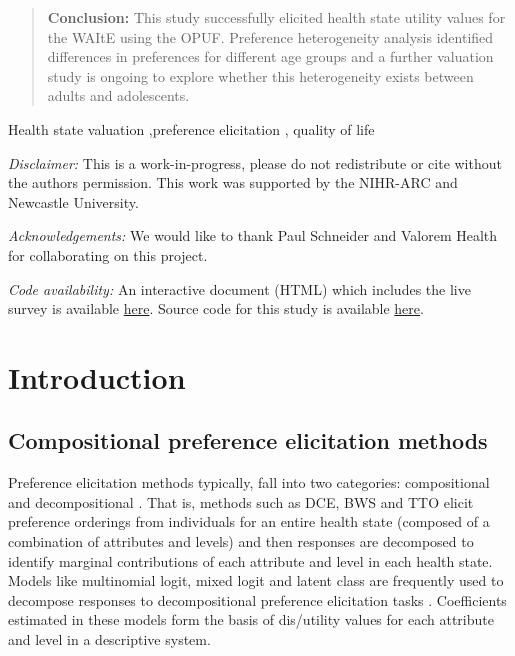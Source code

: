 \documentclass[
  number,
  preprint]{elsarticle}
\begin{document}
\begin{frontmatter}
\begin{abstract}
\textbf{Conclusion:} This study successfully elicited health state
utility values for the WAItE using the OPUF. Preference heterogeneity
analysis identified differences in preferences for different age groups
and a further valuation study is ongoing to explore whether this
heterogeneity exists between adults and adolescents.
\end{abstract}





\begin{keyword}
    Health state valuation \sep preference elicitation \sep 
    quality of life
\end{keyword}
\end{frontmatter}
    

\emph{Disclaimer:} This is a work-in-progress, please do not
redistribute or cite without the authors permission. This work was
supported by the NIHR-ARC and Newcastle University.

\emph{Acknowledgements:} We would like to thank Paul Schneider and
Valorem Health for collaborating on this project.

\emph{Code availability:} An interactive document (HTML) which includes
the live survey is available \href{}{here}. Source code for this study
is available \href{}{here}.

\section{Introduction}\label{sec-introduction}

\subsection{Compositional preference elicitation
methods}\label{compositional-preference-elicitation-methods}

Preference elicitation methods typically, fall into two categories:
compositional and decompositional
\citep{Keeney1979DecisionsTrade-Offs, Marsh2016MultipleForce, Belton2002MultipleAnalysis}.
That is, methods such as DCE, BWS and TTO elicit preference orderings
from individuals for an entire health state (composed of a combination
of attributes and levels) and then responses are decomposed to identify
marginal contributions of each attribute and level in each health state.
Models like multinomial logit, mixed logit and latent class are
frequently used to decompose responses to decompositional preference
elicitation tasks \citep{Hauber2016StatisticalForce}. Coefficients
estimated in these models form the basis of dis/utility values for each
attribute and level in a descriptive system.
\end{document}
